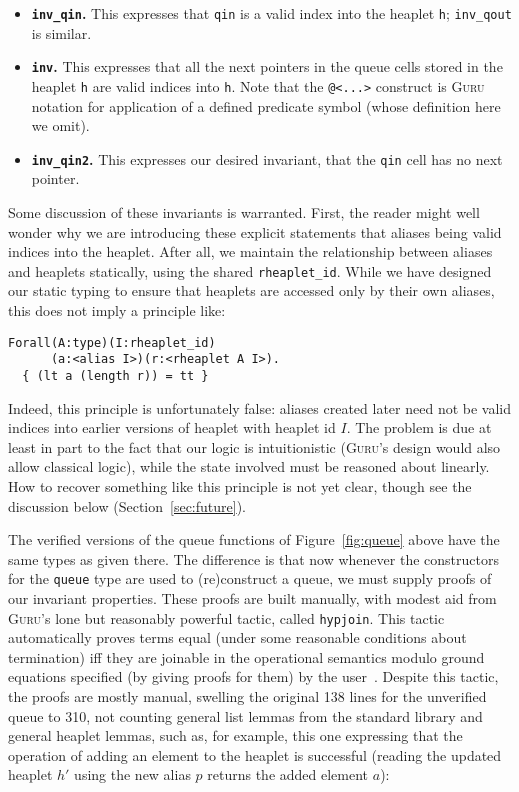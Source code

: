 \documentclass[9pt,natbib]{sigplanconf}
\begin{document}
\begin{itemize}
\item \textbf{\texttt{inv\_qin}.}  This expresses that \texttt{qin} is
a valid index into the heaplet \texttt{h}; \texttt{inv\_qout} is similar.
\item \textbf{\texttt{inv}.} This expresses that all the next pointers
  in the queue cells stored in the heaplet \texttt{h} are valid
  indices into \texttt{h}.  Note that the \texttt{@<...>} construct is
  \textsc{Guru} notation for application of a defined predicate symbol
  (whose definition here we omit).
\item \textbf{\texttt{inv\_qin2}.} This expresses our desired
  invariant, that the \texttt{qin} cell has no next pointer.
\end{itemize}

\noindent Some discussion of these invariants is warranted.  First,
the reader might well wonder why we are introducing these explicit
statements that aliases being valid indices into the heaplet.  After
all, we maintain the relationship between aliases and heaplets
statically, using the shared \texttt{rheaplet\_id}.  
While we have designed our static typing to ensure that heaplets
are accessed only by their own aliases, this does not imply a principle like:

{\small
\begin{verbatim}
Forall(A:type)(I:rheaplet_id)
      (a:<alias I>)(r:<rheaplet A I>).
  { (lt a (length r)) = tt }
\end{verbatim}
}

\noindent Indeed, this principle is unfortunately false: aliases
created later need not be valid indices into earlier versions of
heaplet with heaplet id $I$.  The problem is due at least in part to
the fact that our logic is intuitionistic (\textsc{Guru}'s design
would also allow classical logic), while the state involved must be
reasoned about linearly.  How to recover something like this principle
is not yet clear, though see the discussion below
(Section~\ref{sec:future}).

The verified versions of the queue functions of Figure~\ref{fig:queue}
above have the same types as given there.  The difference is that now
whenever the constructors for the \texttt{queue} type are used to
(re)construct a queue, we must supply proofs of our invariant
properties.  These proofs are built manually, with modest aid from
\textsc{Guru}'s lone but reasonably powerful tactic, called
\texttt{hypjoin}.  This tactic automatically proves terms equal (under
some reasonable conditions about termination) iff they are joinable in
the operational semantics modulo ground equations specified (by giving
proofs for them) by the user~\cite{petcher09,petcher08}.  Despite this
tactic, the proofs are mostly manual, swelling the original 138 lines
for the unverified queue to 310, not counting general list lemmas from
the standard library and general heaplet lemmas, such as, for example,
this one expressing that the operation of adding an element to the
heaplet is successful (reading the updated heaplet $h'$ using the new
alias $p$ returns the added element $a$):
\end{document}
